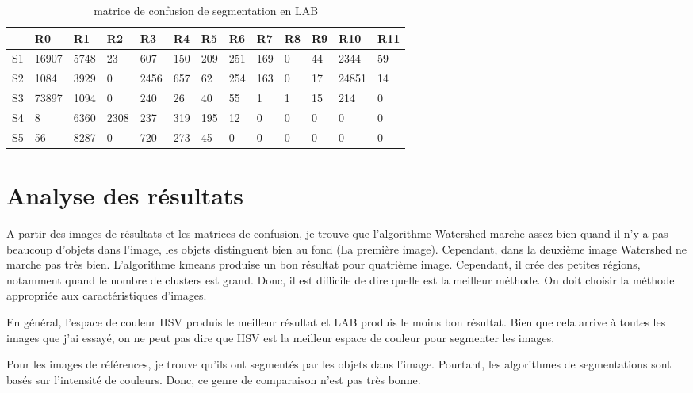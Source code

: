 \documentclass[article=a4, fontsize=11pt]{scrartcl}	%
\begin{document}
\begin{table}[!ht]
	\begin{center}
	    \begin{tabular}{| l | l | l | l | l | l | l | l | l | l | l | l | l |  }
	    	\hline
	    	  & R0 & R1 & R2 & R3 & R4 & R5 & R6 & R7 & R8 & R9 & R10 & R11\\
	    	\hline
	    	S1 & 16907 & 5748 & 23 & 607 & 150 & 209 & 251 & 169 & 0 & 44 & 2344 & 59\\
	    	\hline
	    	S2 & 1084 & 3929 & 0 & 2456 & 657 & 62 & 254 & 163 & 0 & 17 & 24851 & 14\\
	    	\hline
	    	S3 & 73897 & 1094 & 0 & 240 & 26 & 40 & 55 & 1 & 1 & 15 & 214 & 0\\
	    	\hline
	    	S4 & 8 & 6360 & 2308 & 237 & 319 & 195 & 12 & 0 & 0 & 0 & 0 & 0\\
	    	\hline
	    	S5 & 56 & 8287 & 0 & 720 & 273 & 45 & 0 & 0 & 0 & 0 & 0 & 0\\
	    	\hline	    	
	    \end{tabular}
	\end{center}
	\caption {matrice de confusion de segmentation en LAB}
\end{table}

\clearpage
\section{Analyse des résultats}
\normalsize A partir des images de résultats et les matrices de confusion, je trouve que l'algorithme Watershed marche assez bien quand il n'y a pas beaucoup d'objets dans l'image, les objets distinguent bien au fond (La première image). Cependant, dans la deuxième image Watershed ne marche pas très bien.
L'algorithme kmeans produise un bon résultat pour quatrième image. Cependant, il crée des petites régions, notamment quand le nombre de clusters est grand.
Donc, il est difficile de dire quelle est la meilleur méthode. On doit choisir la méthode appropriée aux caractéristiques d'images.

En général, l'espace de couleur HSV produis le meilleur résultat et LAB produis le moins bon résultat. Bien que cela arrive à toutes les images que j'ai essayé, on ne peut pas dire que HSV est la meilleur espace de couleur pour segmenter les images.

Pour les images de références, je trouve qu'ils ont segmentés par les objets dans l'image. Pourtant, les algorithmes de segmentations sont basés sur l'intensité de couleurs. Donc, ce genre de comparaison n'est pas très bonne.
\end{document}
